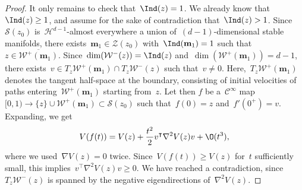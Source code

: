\begin{proof}
                It only remains to check that~$\Ind(z) = 1$. We already know that~$\Ind(z)\geq 1$, and assume for the sake of contradiction that~$\Ind(z)>1$. Since~$\mathcal S(z_0)$ is~$\mathcal H^{d-1}$-almost everywhere a union of~$(d-1)$-dimensional stable manifolds, there exists~$\mathbf m_1\in\mathcal Z(z_0)$ with~$\Ind(\mathbf m_1)=1$ such that~$z\in \overline{\mathcal W^+(\mathbf m_1)}$.
                Since~$\dim(\mathcal W^-(z)) = \Ind(z)$ and~$\dim(\mathcal W^+(\mathbf m_1))=d-1$, there exists~$v \in T_z \mathcal W^+(\mathbf{m}_1)\cap T_z \mathcal W^-(z)$ such that~$v\neq 0$. Here,~$T_z \mathcal W^+(\mathbf{m}_1)$ denotes the tangent half-space at the boundary, consisting of initial velocities of paths entering~$\mathcal W^+(\mathbf{m}_1)$ starting from~$z$.
                Let then $f$ be a~$\mathcal C^\infty$ map~$[0,1)\to \{z\}\cup \mathcal W^+(\mathbf m_1) \subset \mathcal S(z_0)$ such that~$f(0)=z$ and~$f'(0^+)=v$.
                Expanding, we get
                \[V(f(t))=V(z)+\frac{t^2}2 v^\intercal \nabla^2 V(z) v + \O(t^3),\]
                where we used~$\nabla V(z)=0$ twice. Since~$V(f(t))\geq V(z)$ for~$t$ sufficiently small, this implies~$v^\intercal \nabla^2 V(z) v \geq 0$. We have reached a contradiction, since~$T_z\mathcal W^{-}(z)$ is spanned by the negative eigendirections of~$\nabla^2 V(z)$.
            \end{proof}

